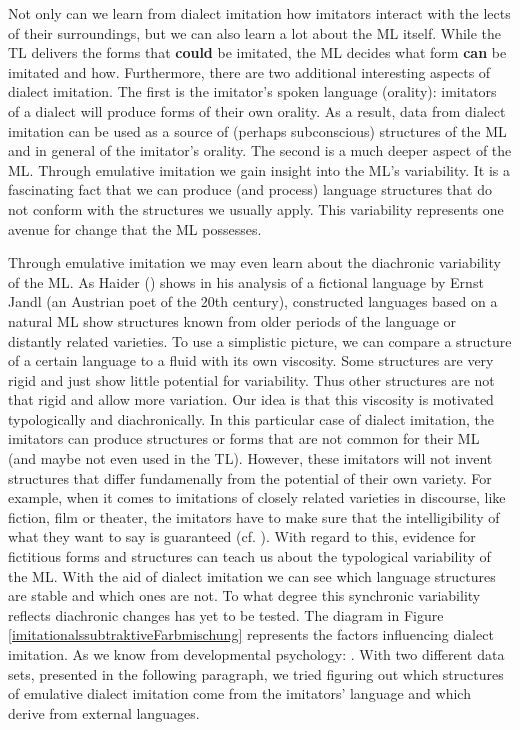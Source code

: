 \documentclass[output=paper]{LSP/langsci}
\begin{document}
Not only can we learn from dialect imitation how imitators interact with the lects of their surroundings, but we can also learn a lot about the ML itself. While the TL delivers the forms that \textbf{could} be imitated, the ML decides what form \textbf{can} be imitated and how.  Furthermore, there are two additional interesting aspects of dialect imitation. The first is the imitator’s spoken language (orality): imitators of a dialect will produce forms of their own orality. As a result, data from dialect imitation can be used as a source of (perhaps subconscious) structures of the ML and in general of the imitator’s orality. The second is a much deeper aspect of the ML. Through emulative imitation we gain insight into the ML’s variability. It is a fascinating fact that we can produce (and process) language structures that do not conform with the structures we usually  apply. This variability represents one avenue for change that the ML possesses. 

Through emulative imitation we may even learn about the diachronic variability of the ML. As Haider (\citeyear[135]{haider_poetenpidgin_2007}) shows in his analysis of a fictional language by Ernst Jandl (an Austrian poet of the 20th century), constructed languages based on a natural ML show structures known from older periods of the language or distantly related varieties. To use a simplistic picture, we can compare a structure of a certain language to a fluid with its own viscosity. Some structures are very rigid and just show little potential for variability. Thus other structures are not that rigid and allow more variation. Our idea is that this viscosity is motivated typologically and diachronically. In this particular case of dialect imitation, the imitators can produce structures or forms that are not common for their ML (and maybe not even used in the TL). However, these imitators will not invent structures that differ fundamenally from the potential of their own variety. For example, when it comes to imitations of closely related varieties in discourse, like fiction, film or theater, the imitators have to make sure that the intelligibility of what they want to say is guaranteed (cf. \citeyear{schafer_imitationen_2014}). With regard to this, evidence for fictitious forms and structures can teach us about the typological variability of the ML. With the aid of dialect imitation we can see which language structures are stable and which ones are not. To what degree this synchronic variability reflects diachronic changes has yet to be tested. The diagram in Figure \ref{imitationalssubtraktiveFarbmischung} represents the factors influencing dialect imitation. As we know from developmental psychology:  \citep[2]{uzgiris_two_1981}. With two different data sets, presented in the following paragraph, we tried figuring out which structures of emulative dialect imitation come from the imitators' language and which derive from external languages.
\end{document}
